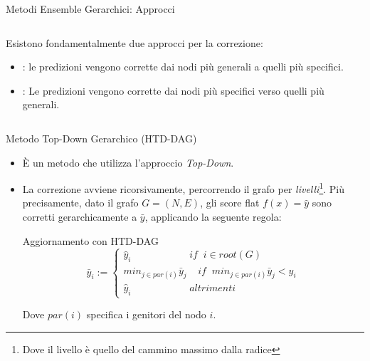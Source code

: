 \documentclass[9pt]{beamer}
\begin{document}
\begin{tframe}{Metodi Ensemble Gerarchici: Approcci}
\begin{columns}
    \begin{column}{.50\textwidth}
      \minipage[c][0.4\textheight][s]{\columnwidth}
      Esistono fondamentalmente due approcci per la correzione:
	   \begin{itemize}
	  \item {}: le predizioni vengono corrette dai nodi più generali a quelli più specifici.
	  \item {}: Le predizioni vengono corrette dai nodi più specifici verso quelli più generali.
      \end{itemize}
      \endminipage 
    \end{column}
    \begin{column}{.50\textwidth}
        \minipage[c][0.4\textheight][s]{\columnwidth}
        \endminipage
    \end{column}
  \end{columns}
\end{tframe}

\begin{tframe}{Metodo Top-Down Gerarchico (HTD-DAG)}
\begin{itemize}

\item È un metodo che utilizza l'approccio \emph{Top-Down}.
\item La correzione avviene ricorsivamente, percorrendo il grafo per \emph{livelli}\footnote{\footnotesize{Dove il livello è quello del cammino massimo dalla radice}}. Più precisamente, dato il grafo $G = (N, E)$, gli score flat $f(x) = \hat{y}$ sono corretti gerarchicamente a $\bar{y}$, applicando la seguente regola:
\begin{block}{Aggiornamento con HTD-DAG}
\[
\bar{y}_i := 
\begin{cases}
\hat{y}_i \;\;\;\;\;\;\;\;\;\;\;\;\;\;\;\;\;\;\;\;\; if\;\; i \in root(G)\\
min_{j \in par(i)} \bar{y}_j \;\;\;\; if \;\; min_{j \in par(i)}\bar{y}_j < \hat{y}_i\\
\hat{y}_i \;\;\;\;\;\;\;\;\;\;\;\;\;\;\;\;\;\;\;\;\; altrimenti
\end{cases}
\]
\end{block}
Dove $par(i)$ specifica i genitori del nodo $i$.
\end{itemize} 
\end{tframe}
\end{document}
